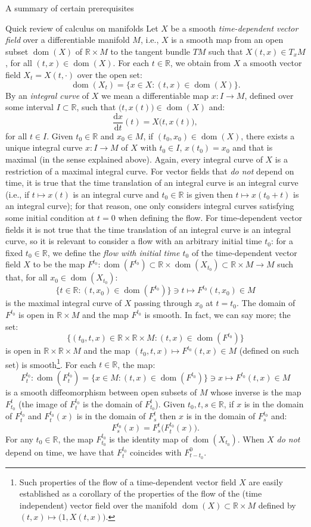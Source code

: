 \documentclass[oneside,a4paper,11pt]{amsbook}
\newcommand{\R}{\mathds R}
\newcommand{\dd}{\mathrm d}
\DeclareMathOperator{\Dom}{dom}
\theoremstyle{remark}\newtheorem{exercise}{Exercise}[chapter]
\theoremstyle{plain}\newtheorem{teo}{Theorem}[section]
\theoremstyle{plain}\newtheorem{lem}[teo]{Lemma}
\theoremstyle{plain}\newtheorem{prop}[teo]{Proposition}
\theoremstyle{plain}\newtheorem{cor}[teo]{Corollary}
\theoremstyle{definition}\newtheorem{defin}[teo]{Definition}
\theoremstyle{remark}\newtheorem{rem}[teo]{Remark}
\theoremstyle{definition}\newtheorem{notation}[teo]{Notation}
\theoremstyle{definition}\newtheorem{convention}[teo]{Convention}
\theoremstyle{definition}\newtheorem{example}[teo]{Example}
\numberwithin{section}{chapter}
\numberwithin{equation}{section}
\begin{document}
\begin{chapter}{A summary of certain prerequisites}
\begin{section}{Quick review of calculus on manifolds}
Let $X$ be a smooth {\em time-dependent vector field\/} over a differentiable manifold $M$, i.e., $X$ is a smooth
map from an open subset $\Dom(X)$ of $\R\times M$ to the tangent bundle $TM$ such that
$X(t,x)\in T_xM$, for all $(t,x)\in\Dom(X)$.
For each $t\in\R$, we obtain from $X$ a smooth vector field $X_t=X(t,\cdot)$ over the open set:
\[\Dom(X_t)=\big\{x\in X:(t,x)\in\Dom(X)\big\}.\]
By an {\em integral curve\/} of $X$ we mean a differentiable map
$x:I\to M$, defined over some interval $I\subset\R$, such that $\big(t,x(t)\big)\in\Dom(X)$ and:
\[\frac{\dd x}{\dd t}(t)=X\big(t,x(t)\big),\]
for all $t\in I$. Given $t_0\in\R$ and $x_0\in M$, if $(t_0,x_0)\in\Dom(X)$,
there exists a unique integral curve $x:I\to M$ of $X$
with $t_0\in I$, $x(t_0)=x_0$ and that is maximal (in the sense explained above). Again, every integral curve of $X$
is a restriction of a maximal integral curve. For vector fields that {\em do not\/} depend on time, it is true that the
time translation of an integral curve is an integral curve (i.e., if $t\mapsto x(t)$ is an integral curve and $t_0\in\R$
is given then $t\mapsto x(t_0+t)$ is an integral curve); for that reason, one only considers integral curves satisfying
some initial condition at $t=0$ when defining the flow. For time-dependent vector fields it is not true that the
time translation of an integral curve is an integral curve, so it is relevant to consider a flow with an arbitrary
initial time $t_0$: for a fixed $t_0\in\R$, we define the {\em flow with initial time $t_0$\/}
of the time-dependent vector field $X$ to be the map $F^{t_0}:\Dom(F^{t_0})\subset\R\times\Dom(X_{t_0})\subset
\R\times M\to M$ such that, for all $x_0\in\Dom(X_{t_0})$:
\[\big\{t\in\R:(t,x_0)\in\Dom(F^{t_0})\big\}\ni t\longmapsto F^{t_0}(t,x_0)\in M\]
is the maximal integral curve of $X$ passing through $x_0$ at $t=t_0$. The domain of $F^{t_0}$ is open in $\R\times M$
and the map $F^{t_0}$ is smooth. In fact, we can say more; the set:
\[\big\{(t_0,t,x)\in\R\times\R\times M:(t,x)\in\Dom(F^{t_0})\big\}\]
is open in $\R\times\R\times M$ and the map $(t_0,t,x)\mapsto F^{t_0}(t,x)\in M$ (defined on such set) is smooth\footnote{%
Such properties of the flow of a time-dependent vector field $X$ are easily established as a corollary of the properties of the flow of the (time independent)
vector field over the manifold $\Dom(X)\subset\R\times M$ defined by $(t,x)\mapsto\big(1,X(t,x)\big)$.}.
For each $t\in\R$, the map:
\[F^{t_0}_t:\Dom(F^{t_0}_t)=\big\{x\in M:(t,x)\in\Dom(F^{t_0})\big\}\ni x\longmapsto F^{t_0}(t,x)\in M\]
is a smooth diffeomorphism between open subsets of $M$ whose inverse is the map $F^t_{t_0}$ (the image
of $F^{t_0}_t$ is the domain of $F^t_{t_0}$). Given $t_0,t,s\in\R$, if $x$ is in the domain of $F^{t_0}_t$ and
$F^{t_0}_t(x)$ is in the domain of $F^t_s$ then $x$ is in the domain of $F^{t_0}_s$ and:
\[F^{t_0}_s(x)=F^t_s\big(F^{t_0}_t(x)\big).\]
For any $t_0\in\R$, the map $F^{t_0}_{t_0}$ is the identity map of $\Dom(X_{t_0})$.
When $X$ {\em do not\/} depend on time, we have that $F^{t_0}_t$ coincides with $F^0_{t-t_0}$.


\end{section}
\end{chapter}
\end{document}
